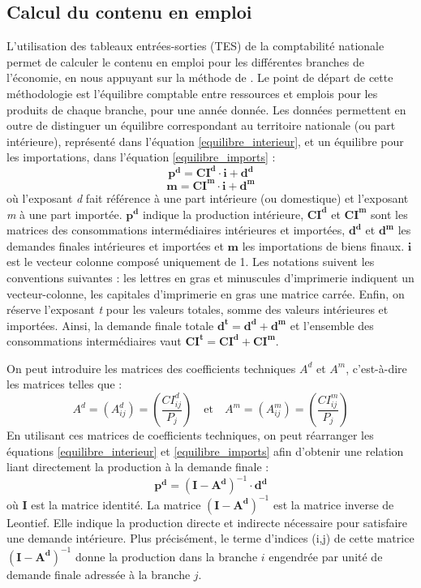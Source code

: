 \subsection{Calcul du contenu en emploi}
L’utilisation des tableaux entrées-sorties (TES) de la comptabilité nationale permet de calculer le contenu en emploi pour les différentes branches de l’économie, en nous appuyant sur la méthode de \citet{Leontief1986}. Le point de départ de cette méthodologie est l’équilibre comptable entre ressources et emplois pour les produits de chaque branche, pour une année donnée. Les données permettent en outre de distinguer un équilibre correspondant au territoire nationale (ou part intérieure), représenté dans l'équation \ref{equilibre_interieur}, et un équilibre pour les importations, dans l'équation \ref{equilibre_imports} :
\begin{equation}
\pmb{p^d} = \pmb{CI^d} \cdot \pmb{i} + \pmb{d^d}	
\label{equilibre_interieur}
\end{equation}
\begin{equation}
\pmb{m} = \pmb{CI^m} \cdot \pmb{i} + \pmb{d^m}	
\label{equilibre_imports}
\end{equation}
où l'exposant \textit{d} fait référence à une part intérieure (ou domestique) et l'exposant \textit{m} à une part importée. $\pmb{p^d}$ indique la production intérieure, $\pmb{CI^d}$ et $\pmb{CI^m}$ sont les matrices des consommations intermédiaires intérieures et importées, $\pmb{d^d}$ et $\pmb{d^m}$ les demandes finales intérieures et importées et $\pmb{m}$ les importations de biens finaux. $\pmb{i}$ est le vecteur colonne composé uniquement de 1. Les notations suivent les conventions suivantes : les lettres en gras et minuscules d’imprimerie indiquent un vecteur-colonne, les capitales d’imprimerie en gras une matrice carrée. Enfin, on réserve l'exposant \textit{t} pour les valeurs totales, somme des valeurs intérieures et importées. Ainsi, la demande finale totale $\pmb{d^t=d^d+d^m}$ et l'ensemble des consommations intermédiaires vaut $\pmb{CI^t=CI^d+CI^m}$.


On peut introduire les matrices des coefficients techniques $A^d$ et $A^m$, c'est-à-dire les matrices telles que :
\begin{equation*}
A^d = (A^d_{ij}) = \left( \frac{CI^d_{ij}}{P_j} \right) \quad \text{et} \quad A^m = (A^m_{ij}) = \left( \frac{CI^m_{ij}}{P_j} \right)
\end{equation*}
En utilisant ces matrices de coefficients techniques, on peut réarranger les équations \ref{equilibre_interieur} et \ref{equilibre_imports} afin d'obtenir une relation liant directement la production à la demande finale :
\begin{equation}
\pmb{p^d} = (\pmb{I} - \pmb{A^d})^{-1} \cdot \pmb{d^d}	
\label{equilibre_interieur2}
\end{equation}
où $\pmb{I}$ est la matrice identité. La matrice $(\pmb{I} - \pmb{A^d})^{-1}$ est la matrice inverse de Leontief. 
Elle indique la production directe et indirecte nécessaire pour satisfaire une demande intérieure. 
Plus précisément, le terme d'indices (i,j) de cette matrice $(\pmb{I} - \pmb{A^d})^{-1}$ donne la production dans la branche $i$ engendrée par unité de demande finale adressée à la branche $j$.

